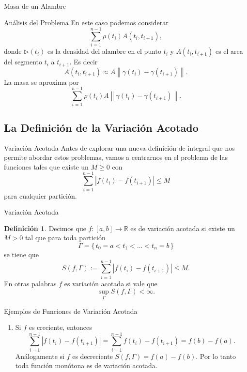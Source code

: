 \documentclass[utf8]{beamer}
\theoremstyle{plain}
\theoremstyle{definition}
\newtheorem{Def}{Definición}           %
\theoremstyle{remark}
\numberwithin{equation}{section}
\newcommand{\Ga}{\Gamma}                %
\newcommand{\ga}{\gamma}                %
\newcommand{\bR}{\mathbb{R}}    %
\newcommand{\nm}[1]{\left\|#1\right\|} %
\newcommand{\set}[1]{\{\,#1\,\}}    %
\renewcommand{\geq}{\geqslant}          %
\renewcommand{\leq}{\leqslant}          %
\renewcommand{\.}{\Cdot}                %
\begin{document}
\begin{frame}{Masa de un Alambre}
\begin{figure}
  \end{figure}
  
\end{frame}

\begin{frame}{Análisis del Problema}
  En este caso podemos considerar 
  $$\sum_{i=1}^{n-1}\rho(t_i)A(t_i,t_{i+1}),$$
  donde $\rhd(t_i)$ es la densidad del alambre en el punto
  $t_i$ y $A(t_i,t_{i+1})$ es el area del segmento $t_i$ a $t_{i+1}$. Es decir 
  $$A(t_i,t_{i+1})\approx A\nm{\ga(t_i)-\ga(t_{i+1})}.$$
  La masa se aproxima por 
  $$\sum_{i=1}^{n-1}\rho(t_i)A\nm{\ga(t_i)-\ga(t_{i+1})}.$$
\end{frame}

\subsection{La Definición de la Variación Acotado}

\begin{frame}{Variación Acotada}
  Antes de explorar una nueva definición de integral que nos permite abordar estos problemas, vamos a centrarnos en el problema de las funciones tales que existe un $M\geq 0$ con 
  $$\sum_{i=1}^{n-1}|f(t_i)-f(t_{i+1})|\leq M$$
  para cualquier partición.
\end{frame}

\begin{frame}{Variación Acotada}
  \begin{Def}\label{def:varAcot}
    Decimos que $f:[a,b]\to\bR$ es de \alert{variación acotada} si existe un $M> 0$ tal que para toda partición 
    $$\Ga=\set{t_0=a<t_1<\dots<t_n=b}$$
    se tiene que 
    $$S(f,\Ga):=\sum_{i=1}^{n-1}|f(t_i)-f(t_{i+1})|\leq M.$$
    En otras palabras $f$ es variación acotada si vale que $$\sup_\Ga S(f,\Ga)<\infty.$$
  \end{Def}
\end{frame}

\begin{frame}{Ejemplos de Funciones de Variación Acotada}
  \begin{enumerate}
    \item Si $f$ es creciente, entonces
    $$\sum_{i=1}^{n-1}|f(t_i)-f(t_{i+1})|=\sum_{i=1}^{n-1}f(t_i)-f(t_{i+1})=f(b)-f(a).$$
    Análogamente si $f$ es decreciente $S(f,\Ga)=f(a)-f(b)$. Por lo tanto \alert{toda función monótona es de variación acotada}.
    \setcounter{saveenumi}{\value{enumi}}
  \end{enumerate}
\end{frame}
\end{document}
